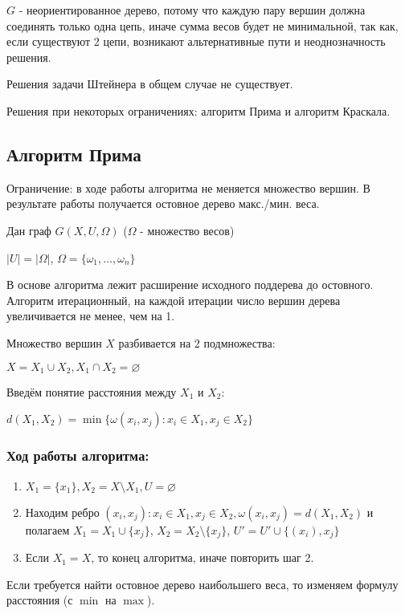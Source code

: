\documentclass[10pt]{article}
\begin{document}
\par $G$ - неориентированное дерево, потому что каждую пару вершин должна соединять только одна цепь, иначе сумма весов будет не минимальной, так как, если существуют 2 цепи, возникают альтернативные пути и неоднозначность решения.
\par Решения задачи Штейнера в общем случае не существует.
\par Решения при некоторых ограничениях: алгоритм Прима и алгоритм Краскала.
\subsection*{Алгоритм Прима}
\par Ограничение: в ходе работы алгоритма не меняется множество вершин. В результате работы получается остовное дерево макс./мин. веса.
\par Дан граф $G(X, U, \Omega)$ ($\Omega$ - множество весов)
\par $|U| = |\Omega|$, $\Omega = \{ \omega_{1}, \dots, \omega_{n} \}$
\par В основе алгоритма лежит расширение исходного поддерева до остовного. Алгоритм итерационный, на каждой итерации число вершин дерева увеличивается не менее, чем на 1.
\par Множество вершин $X$ разбивается на 2 подмножества:
\par $X = X_{1} \cup X_{2}, X_{1} \cap X_{2} = \varnothing$
\par Введём понятие расстояния между $X_{1}$ и $X_{2}$:
\par $d(X_{1}, X_{2}) = \min \{ \omega(x_{i}, x_{j}): x_{i} \in X_{1}, x_{j} \in X_{2} \}$
\subsubsection*{Ход работы алгоритма:}
\begin{enumerate}
    \item $X_{1} = \{ x_{1} \}, X_{2} = X \setminus X_{1}, U = \varnothing$
    \item Находим ребро $(x_{i}, x_{j}): x_{i} \in X_{1}, x_{j} \in X_{2}, \omega(x_{i}, x_{j}) = d(X_{1}, X_{2})$ и полагаем $X_{1} = X_{1} \cup \{ x_{j} \}$, $X_{2} = X_{2} \setminus \{ x_{j} \}$, $U' = U' \cup \{ (x_{i}), x_{j} \}$
    \item Если $X_{1} = X$, то конец алгоритма, иначе повторить шаг 2.
\end{enumerate}

\par Если требуется найти остовное дерево наибольшего веса, то изменяем формулу расстояния (с $\min$ на $\max$).
\end{document}
